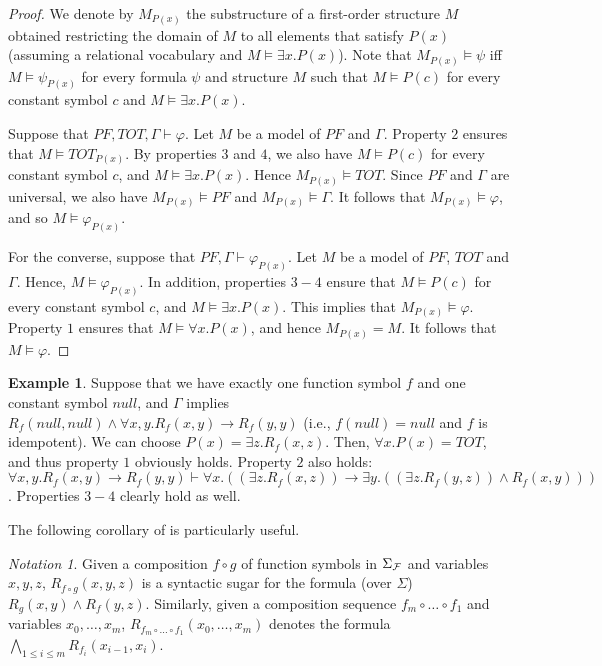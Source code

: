 \documentclass[11pt,a4paper,oneside]{article}
\theoremstyle{definition}
\newtheorem{example}[definition]{Example}
\theoremstyle{remark}
\newtheorem{notation}[definition]{Notation}
\newcommand{\vd}{\vdash}
\newcommand{\til}{,\dots,}
\newcommand{\circtil}{\circ \dots \circ}
\newcommand{\fe}{\varphi}
\begin{document}
\begin{proof}
We denote by $M_{P(x)}$ the substructure of a first-order structure $M$ obtained restricting the domain of $M$ to all elements that satisfy $P(x)$ (assuming a relational vocabulary and ${M \models \exists x. P(x)} $). Note that $M_{P(x)} \models \psi$ iff $M \models \psi_{P(x)}$ for every formula $\psi$ and structure $M$ such that $M \models P(c)$ for every constant symbol $c$ and $M \models \exists x. P(x) $.

Suppose that $PF, TOT, \Gamma \vd \fe$.
Let $M$ be a model of $PF$ and $\Gamma$.
Property $2$ ensures that $M \models TOT_{P(x)}$.
By properties $3$ and $4$, we also have $M \models P(c)$
for every constant symbol $c$, and $M \models \exists x. P(x)$.
Hence $M_{P(x)} \models TOT$.
Since $PF$ and $\Gamma$ are universal, we also have ${M_{P(x)} \models PF}$ and ${M_{P(x)} \models \Gamma}$.
It follows that $M_{P(x)} \models \fe$, and so $M \models \fe_{P(x)}$.

For the converse, suppose that $PF, \Gamma \vd \fe_{P(x)}$.
Let $M$ be a model of $PF$, $TOT$ and $\Gamma$.
Hence, $M \models \fe_{P(x)}$.
In addition, properties $3-4$ ensure that 
$M \models P(c)$ for every constant symbol $c$, 
and  $M \models \exists x. P(x)$.
This implies that $M_{P(x)} \models \fe$.
Property $1$ ensures that $M \models \forall x. P(x)$, and hence $M_{P(x)}=M$.
It follows that $M \models \fe$.
\end{proof}

\begin{example}
\label{idempotent}
Suppose that we have exactly one function symbol $f$ and one constant symbol $null$,
and $\Gamma$ implies $R_f(null,null) \land \forall x, y. R_f(x,y) \to R_f (y,y)$
(i.e., $f(null)=null$ and $f$ is idempotent).
We can choose ${P(x)=\exists z. R_f (x,z)}$.
Then, $\forall x. P(x)= TOT$, and thus property $1$ obviously holds.
Property $2$ also holds:
$\forall x, y. R_f(x,y) \to R_f (y,y) \vdash  \forall x. \left( (\exists z. R_f (x,z)) \to \exists y. \left((\exists z. R_f (y,z)) \land R_f(x,y)\right)\right)$.
Properties $3-4$ clearly hold as well.
\end{example}

The following corollary of  is particularly useful.

\begin{notation}
Given a composition $f\circ g$ of function symbols in $\Sigma_{\cal F}$ and variables $x,y,z$, $R_{f \circ g}(x,y,z)$ is a syntactic sugar for the formula (over $\Sigma$) $R_g(x,y) \land R_f(y,z)$. Similarly, 
given a composition sequence $f_m \circtil f_1$ and variables $x_0 \til x_m$,
$R_{f_m\circtil f_1}(x_0\til x_m)$ denotes the formula
$\bigwedge_{1\leq i\leq m} R_{f_i}(x_{i-1},x_i)$.
\end{notation}
\end{document}
